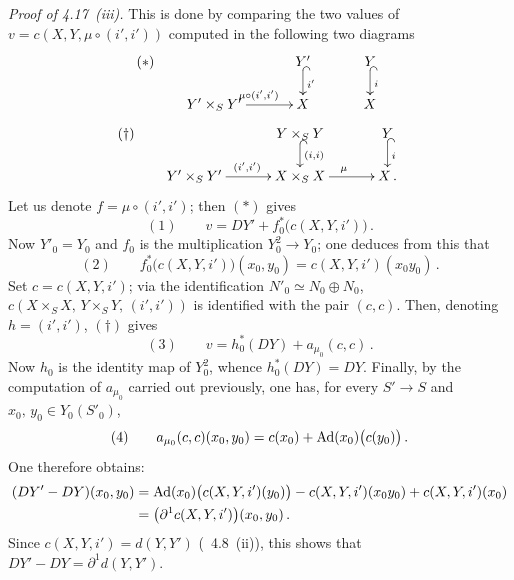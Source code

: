 \label{III.4.20}
{\itshape Proof of 4.17~(iii).}%
{\renewcommand{\thefootnote}{(114)}}
This is done by comparing the two values of
\(v=c(X,Y,\mu\circ(i',i'))\) computed in the following two diagrams
\[
(*)\qquad
\xymatrix@C=3.2em@R=1.6em{
&
Y'
  \ar@{^{(}->}[d]^{i'}
&
Y
  \ar@{^{(}->}[d]^{i}
\\
Y'\times_{S}Y'
  \ar[r]^{{\mu\circ(i',i')}}
&
X
&
X
}
\]
\[
(\dagger)\qquad
\xymatrix@C=3.2em@R=1.6em{
&
Y\times_{S}Y
  \ar@{^{(}->}[d]^{{(i,i)}}
&
Y
  \ar@{^{(}->}[d]^{i}
\\
Y'\times_{S}Y'
  \ar[r]^{{(i',i')}}
&
X\times_{S}X
  \ar[r]^{\mu}
&
X\,.
}
\]
Let us denote \(f=\mu\circ(i',i')\); then \((*)\) gives
\begin{equation*}
(1)\qquad
v=DY'+f_{0}^{*}\bigl(c(X,Y,i')\bigr)\,.
\end{equation*}
Now \(Y'_{0}=Y_{0}\) and \(f_{0}\) is the multiplication \(Y_{0}^{2}\to Y_{0}\);
one deduces from this that
\begin{equation*}
(2)\qquad
f_{0}^{*}\bigl(c(X,Y,i')\bigr)(x_{0},y_{0})
=
c(X,Y,i')(x_{0}y_{0})\,.
\end{equation*}
Set \(c=c(X,Y,i')\); via the identification \(N'_{0}\simeq N_{0}\oplus N_{0}\),
\(c(X\times_{S}X,\,Y\times_{S}Y,\,(i',i'))\) is identified with the pair
\((c,c)\). Then, denoting \(h=(i',i')\), \((\dagger)\) gives
\begin{equation*}
(3)\qquad
v=h_{0}^{*}(DY)+a_{\mu_{0}}(c,c)\,.
\end{equation*}
Now \(h_{0}\) is the identity map of \(Y_{0}^{2}\), whence
\(h_{0}^{*}(DY)=DY\). Finally, by the computation of \(a_{\mu_{0}}\) carried
out previously, one has, for every \(S'\to S\) and
\(x_{0},\,y_{0}\in Y_{0}(S'_{0})\),
\begin{equation*}
(4)\qquad
a_{\mu_{0}}(c,c)(x_{0},y_{0})
=
c(x_{0})+\operatorname{Ad}(x_{0})\bigl(c(y_{0})\bigr)\,.
\end{equation*}
One therefore obtains:
\begin{align*}
(DY'-DY)(x_{0},y_{0})
&=
\operatorname{Ad}(x_{0})\bigl(c(X,Y,i')(y_{0})\bigr)
-c(X,Y,i')(x_{0}y_{0})
+c(X,Y,i')(x_{0})
\\
&=
\bigl(\partial^{1}c(X,Y,i')\bigr)(x_{0},y_{0})\,.
\end{align*}
Since \(c(X,Y,i')=d(Y,Y')\) (\cf~4.8~(ii)), this shows that
\(DY'-DY=\partial^{1}d(Y,Y')\).

